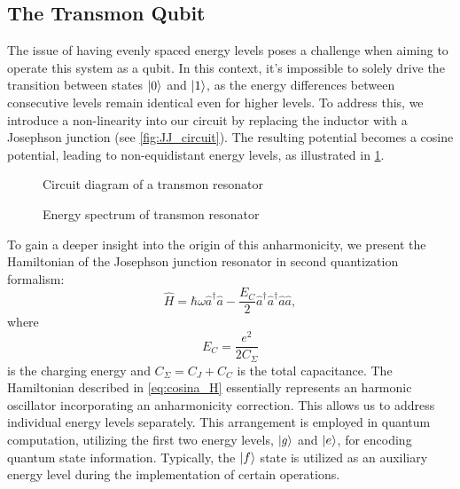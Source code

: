 \subsection{The Transmon Qubit}

The issue of having evenly spaced energy levels poses a challenge when aiming to operate this system as a qubit.
In this context, it's impossible to solely drive the transition between states $\ket{0}$ and $\ket{1}$, as the energy differences between consecutive levels remain identical even for higher levels.
To address this, we introduce a non-linearity into our circuit by replacing the inductor with a Josephson junction \cite{JOSEPHSON} (see \cref{fig:JJ_circuit}).
The resulting potential becomes a cosine potential, leading to non-equidistant energy levels, as illustrated in \cref{fig:Energy_spectrum_JJ}.
\begin{figure}
    \begin{minipage}[b]{0.5\linewidth}
      \centering
        
        \vspace{-0.8cm}
        \caption{Circuit diagram of a transmon resonator}
        \label{fig:JJ_circuit}
    \end{minipage}
    \hfill
    \begin{minipage}[b]{0.45\linewidth}
      \centering
      
      \vspace{-1.2cm}
      \caption{Energy spectrum of transmon resonator}
      \label{fig:Energy_spectrum_JJ}
    \end{minipage}
  \end{figure}

To gain a deeper insight into the origin of this anharmonicity, we present the Hamiltonian of the Josephson junction resonator in second quantization formalism:
\begin{equation}
\label{eq:cosina_H}
    \hat{H} = 
    \hbar \omega \hat{a}^\dagger \hat{a} - 
    \frac{E_C}{2}\hat{a}^\dagger\hat{a}^\dagger\hat{a}\hat{a} ,
\end{equation}
where
\begin{equation}
    E_C = \frac{e^2}{2 C_\Sigma}
\end{equation} 
is the charging energy and $C_\Sigma = C_J + C_C$ is the total capacitance.
The Hamiltonian described in \cref{eq:cosina_H} essentially represents an harmonic oscillator incorporating an anharmonicity correction. 
This allows us to address individual energy levels separately.
This arrangement is employed in quantum computation, utilizing the first two energy levels, $\ket{g}$ and $\ket{e}$, for encoding quantum state information. 
Typically, the $\ket{f}$ state is utilized as an auxiliary energy level during the implementation of certain operations.

